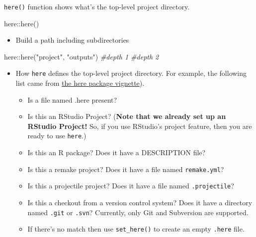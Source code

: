 \documentclass[
]{book}
\newenvironment{Shaded}{\begin{snugshade}}{\end{snugshade}}
\newcommand{\CommentTok}[1]{\textcolor[rgb]{0.56,0.35,0.01}{\textit{#1}}}
\newcommand{\FunctionTok}[1]{\textcolor[rgb]{0.00,0.00,0.00}{#1}}
\newcommand{\NormalTok}[1]{#1}
\newcommand{\SpecialCharTok}[1]{\textcolor[rgb]{0.00,0.00,0.00}{#1}}
\newcommand{\StringTok}[1]{\textcolor[rgb]{0.31,0.60,0.02}{#1}}
\providecommand{\tightlist}{%
  \setlength{\itemsep}{0pt}\setlength{\parskip}{0pt}}
\begin{document}
\texttt{here()} function shows what's the top-level project directory.

\begin{Shaded}
\begin{Highlighting}[]
\NormalTok{here}\SpecialCharTok{::}\FunctionTok{here}\NormalTok{()}
\end{Highlighting}
\end{Shaded}

\begin{itemize}
\tightlist
\item
  Build a path including subdirectories
\end{itemize}

\begin{Shaded}
\begin{Highlighting}[]
\NormalTok{here}\SpecialCharTok{::}\FunctionTok{here}\NormalTok{(}\StringTok{"project"}\NormalTok{, }\StringTok{"outputs"}\NormalTok{)}
           \CommentTok{\#depth 1   \#depth 2}
\end{Highlighting}
\end{Shaded}

\begin{itemize}
\item
  How \texttt{here} defines the top-level project directory. For example, the following list came from \href{https://GitHub.com/jennybc/here_here}{the here package vignette}).

  \begin{itemize}
  \item
    Is a file named .here present?
  \item
    Is this an RStudio Project? (\textbf{Note that we already set up an RStudio Project!} So, if you use RStudio's project feature, then you are ready to use \texttt{here}.)
  \item
    Is this an R package? Does it have a DESCRIPTION file?
  \item
    Is this a remake project? Does it have a file named \texttt{remake.yml}?
  \item
    Is this a projectile project? Does it have a file named \texttt{.projectile}?
  \item
    Is this a checkout from a version control system? Does it have a directory named \texttt{.git} or \texttt{.svn}? Currently, only Git and Subversion are supported.
  \item
    If there's no match then use \texttt{set\_here()} to create an empty \texttt{.here} file.
  \end{itemize}
\end{itemize}
\end{document}
